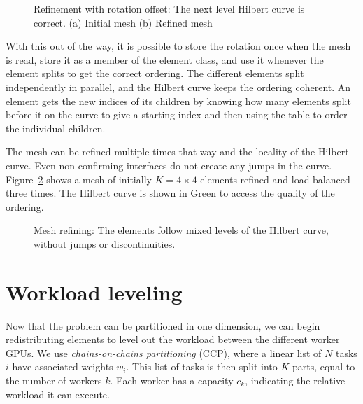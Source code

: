 \begin{figure}[H]
	\centering
	\hfill
	\caption{Refinement with rotation offset: The next level Hilbert curve is correct. (a) Initial mesh (b) Refined mesh}
	\label{fig:hilbert_correct}
\end{figure}

With this out of the way, it is possible to store the rotation once when the mesh is read, store it
as a member of the element class, and use it whenever the element splits to get the correct
ordering. The different elements split independently in parallel, and the Hilbert curve keeps the
ordering coherent. An element gets the new indices of its children by knowing how many elements
split before it on the curve to give a starting index and then using the table to order the
individual children.

The mesh can be refined multiple times that way and the locality of the Hilbert curve. Even
non-confirming interfaces do not create any jumps in the curve. Figure~\ref{fig:mesh_1_after2} shows
a mesh of initially $K = 4 \times 4$ elements refined and load balanced three times. The Hilbert curve is
shown in Green to access the quality of the ordering.

\begin{figure}[H]
	\centering
	
	\caption{Mesh refining: The elements follow mixed levels of the Hilbert curve, without jumps or discontinuities.}
	\label{fig:mesh_1_after2}
\end{figure}

\section{Workload leveling} \label{section:load_balancing:workload_leveling}

Now that the problem can be partitioned in one dimension, we can begin redistributing elements to
level out the workload between the different worker GPUs. We use \textit{chains-on-chains
partitioning} (CCP), where a linear list of $N$ tasks $i$ have associated weights $w_i$. This list
of tasks is then split into $K$ parts, equal to the number of workers $k$. Each worker has a capacity
$c_k$, indicating the relative workload it can execute.

